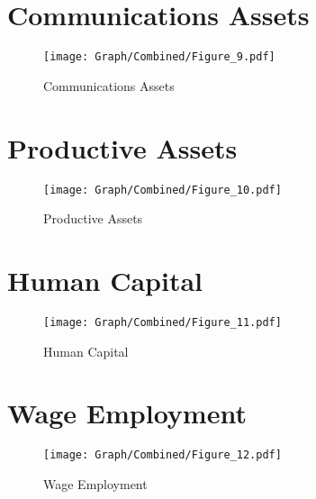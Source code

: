 \documentclass[10pt,a4paper]{article}
\begin{document}
\section{Communications Assets}
\begin{table}[H]\centering

\end{table}
\begin{figure}[H]\centering
\texttt{[image: Graph/Combined/Figure\_9.pdf]}
\caption{Communications Assets} \label{fig:Fig_9}
\end{figure}
\begin{table}[H]\centering

\end{table}
\section{Productive Assets}
\begin{table}[H]\centering

\end{table}
\begin{figure}[H]\centering
\texttt{[image: Graph/Combined/Figure\_10.pdf]}
\caption{Productive Assets} \label{fig:Fig_10}
\end{figure}
\begin{table}[H]\centering

\end{table}
\section{Human Capital}
\begin{table}[H]\centering

\end{table}
\begin{figure}[H]\centering
\texttt{[image: Graph/Combined/Figure\_11.pdf]}
\caption{Human Capital} \label{fig:Fig_11}
\end{figure}
\begin{table}[H]\centering

\end{table}
\section{Wage Employment}
\begin{table}[H]\centering

\end{table}
\begin{figure}[H]\centering
\texttt{[image: Graph/Combined/Figure\_12.pdf]}
\caption{Wage Employment} \label{fig:Fig_12}
\end{figure}
\begin{table}[H]\centering

\end{table}
\end{document}
